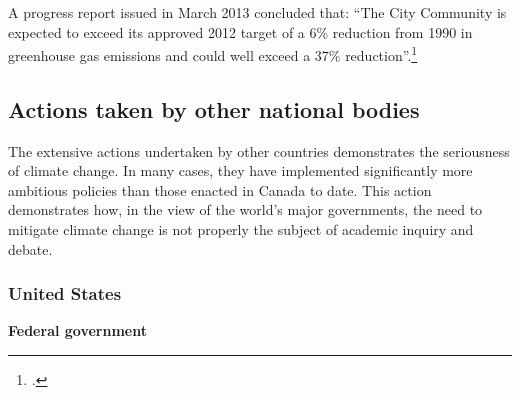 A progress report issued in March 2013 concluded that: ``The City Community is expected to exceed its approved 2012 target of a 6\% reduction from 1990 in greenhouse gas emissions and could well exceed a 37\% reduction''.\footcite[][p. 15]{Toronto2013GHGmemo}






		\subsection{Actions taken by other national bodies}
		
		
		
The extensive actions undertaken by other countries demonstrates the seriousness of climate change.
In many cases, they have implemented significantly more ambitious policies than those enacted in Canada to date.
This action demonstrates how, in the view of the world's major governments, the need to mitigate climate change is not properly the subject of academic inquiry and debate.


		
		\subsubsection{United States}
		
		
		
\textbf{Federal government}



